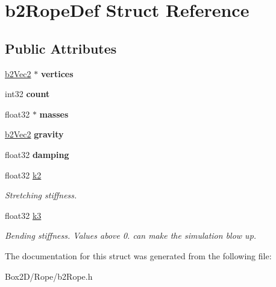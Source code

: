 \hypertarget{structb2_rope_def}{}\section{b2\+Rope\+Def Struct Reference}
\label{structb2_rope_def}
\subsection*{Public Attributes}
\begin{DoxyCompactItemize}
\item 
\mbox{\label{structb2_rope_def_ae18ad98b9796c505ae62ce58fa2f7051}} 
\hyperlink{structb2_vec2}{b2\+Vec2} $\ast$ {\bfseries vertices}
\item 
\mbox{\label{structb2_rope_def_a0c75d4289a807e31f32dc43a2276671f}} 
int32 {\bfseries count}
\item 
\mbox{\label{structb2_rope_def_a78f75cce30ee253062ffa6f5462b36a1}} 
float32 $\ast$ {\bfseries masses}
\item 
\mbox{\label{structb2_rope_def_a90d98969150047662ce835ec1670fb32}} 
\hyperlink{structb2_vec2}{b2\+Vec2} {\bfseries gravity}
\item 
\mbox{\label{structb2_rope_def_a13ad872bb9d4926f3e4e49b7061613cb}} 
float32 {\bfseries damping}
\item 
\mbox{\label{structb2_rope_def_a89de5d2c15afacd41722c76523e33826}} 
float32 \hyperlink{structb2_rope_def_a89de5d2c15afacd41722c76523e33826}{k2}
\begin{DoxyCompactList}\small\item\em Stretching stiffness. \end{DoxyCompactList}\item 
\mbox{\label{structb2_rope_def_a3f4749e0a309b53daf804c75adfb4ba8}} 
float32 \hyperlink{structb2_rope_def_a3f4749e0a309b53daf804c75adfb4ba8}{k3}
\begin{DoxyCompactList}\small\item\em Bending stiffness. Values above 0. can make the simulation blow up. \end{DoxyCompactList}\end{DoxyCompactItemize}


The documentation for this struct was generated from the following file\+:\begin{DoxyCompactItemize}
\item 
Box2\+D/\+Rope/b2\+Rope.\+h\end{DoxyCompactItemize}
